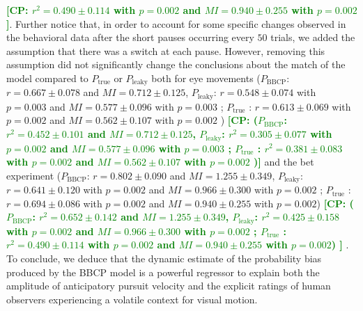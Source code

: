 \documentclass[10pt,letterpaper]{article}
\newcommand{\CP}[1]{\textbf{\textcolor{green}{[CP: #1]}}}
\begin{document}
\CP{$r^{2} = 0.490 \pm 0.114$ with $p=0.002$
and $MI = 0.940 \pm 0.255$ with $p=0.002$}.
Further notice that, in order to account for some specific changes
observed in the behavioral data after the short pauses
occurring every $50$ trials,
we added the assumption %
that there was a switch at each pause.
However, removing this assumption did not significantly change the conclusions about the match of the model
compared to $P_{\text{true}}$ or $P_{\text{leaky}}$
both for eye movements
($P_{\text{BBCP}}$: $r = 0.667 \pm 0.078$ and $MI =  0.712 \pm 0.125$, $P_{\text{leaky}}$: $r = 0.548 \pm 0.074$ with $p=0.003$ and $MI =  0.577 \pm 0.096$ with $p=0.003$ ; $P_{\text{true}}$ : $r = 0.613 \pm 0.069$ with $p=0.002$ and $MI =  0.562 \pm 0.107$ with $p=0.002$ )
\CP{($P_{\text{BBCP}}$: $r^{2} = 0.452 \pm 0.101$ and $MI =  0.712 \pm 0.125$,
$P_{\text{leaky}}$: $r^{2} = 0.305 \pm 0.077$ with $p=0.002$ and $MI =  0.577 \pm 0.096$ with $p=0.003$ ;
$P_{\text{true}}$ : $r^{2} = 0.381 \pm 0.083$ with $p=0.002$ and %
$MI =  0.562 \pm 0.107$ with $p=0.002$ )}
and the bet experiment
($P_{\text{BBCP}}$: $r = 0.802 \pm 0.090$ and $MI =  1.255 \pm 0.349$, $P_{\text{leaky}}$: $r = 0.641 \pm 0.120$ with $p=0.002$ and $MI =  0.966 \pm 0.300$ with $p=0.002$ ; $P_{\text{true}}$ : $r = 0.694 \pm 0.086$ with $p=0.002$ and $MI =  0.940 \pm 0.255$ with $p=0.002$)
\CP{($P_{\text{BBCP}}$: $r^{2} = 0.652 \pm 0.142$ and $MI =  1.255 \pm 0.349$, $P_{\text{leaky}}$: $r^{2} = 0.425 \pm 0.158$ with $p=0.002$ and $MI =  0.966 \pm 0.300$ with $p=0.002$ ; $P_{\text{true}}$ : $r^{2} = 0.490 \pm 0.114$ with $p=0.002$ and $MI =  0.940 \pm 0.255$ with $p=0.002$)
}
.
To conclude, we deduce that the dynamic estimate of the probability bias produced by the BBCP model
is a powerful regressor to explain
both the amplitude of anticipatory pursuit velocity
and the explicit ratings of human observers
experiencing a volatile context for visual motion.

\end{document}
